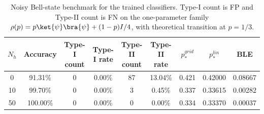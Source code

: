 \begin{table}[H]
\centering
\small
\begin{tabular}{ccccccccc}
\toprule
$N_h$ & Accuracy & Type-I count & Type-I rate & Type-II count & Type-II rate & $p_\ast^{grid}$ & $p_\ast^{lin}$ & BLE \\
\midrule
0 & 91.31\% & 0 & 0.00\% & 87 & 13.04\% & 0.421 & 0.42000 & 0.08667 \\
10 & 99.70\% & 0 & 0.00\% & 3 & 0.45\% & 0.337 & 0.33615 & 0.00282 \\
50 & 100.00\% & 0 & 0.00\% & 0 & 0.00\% & 0.334 & 0.33370 & 0.00037 \\
\bottomrule
\end{tabular}
\caption{Noisy Bell-state benchmark for the trained classifiers. Type-I count is FP and Type-II count is FN on the one-parameter family $\rho(p)=p\ket{\psi}\bra{\psi}+(1-p)I/4$, with theoretical transition at $p=1/3$.}
\label{tab:noisy_bell_benchmark}
\end{table}
